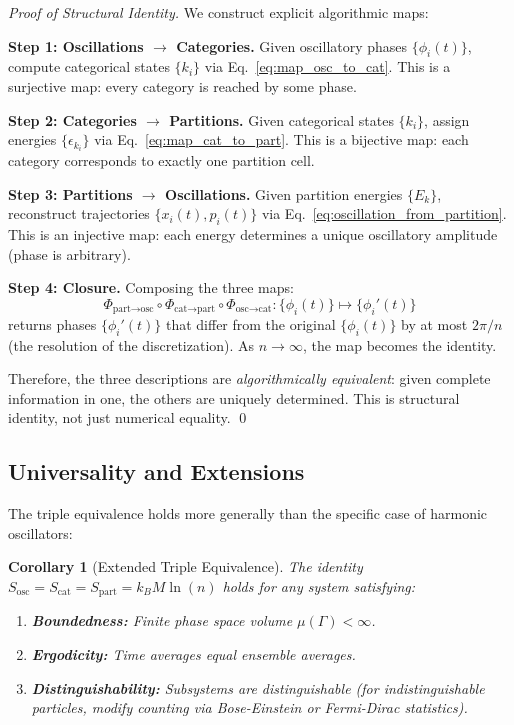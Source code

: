 \documentclass[twocolumn,10pt]{article}
\newtheorem{corollary}[theorem]{Corollary}
\theoremstyle{remark}
\begin{document}
\begin{proof}[Proof of Structural Identity]
We construct explicit algorithmic maps:

\textbf{Step 1: Oscillations $\to$ Categories.}
Given oscillatory phases $\{\phi_i(t)\}$, compute categorical states $\{k_i\}$ via Eq.~\eqref{eq:map_osc_to_cat}. This is a surjective map: every category is reached by some phase.

\textbf{Step 2: Categories $\to$ Partitions.}
Given categorical states $\{k_i\}$, assign energies $\{\epsilon_{k_i}\}$ via Eq.~\eqref{eq:map_cat_to_part}. This is a bijective map: each category corresponds to exactly one partition cell.

\textbf{Step 3: Partitions $\to$ Oscillations.}
Given partition energies $\{E_k\}$, reconstruct trajectories $\{x_i(t), p_i(t)\}$ via Eq.~\eqref{eq:oscillation_from_partition}. This is an injective map: each energy determines a unique oscillatory amplitude (phase is arbitrary).

\textbf{Step 4: Closure.}
Composing the three maps:
\begin{equation}
    \Phi_{\text{part} \to \text{osc}} \circ \Phi_{\text{cat} \to \text{part}} \circ \Phi_{\text{osc} \to \text{cat}}: \{\phi_i(t)\} \mapsto \{\phi_i'(t)\}
\end{equation}
returns phases $\{\phi_i'(t)\}$ that differ from the original $\{\phi_i(t)\}$ by at most $2\pi/n$ (the resolution of the discretization). As $n \to \infty$, the map becomes the identity.

Therefore, the three descriptions are \textit{algorithmically equivalent}: given complete information in one, the others are uniquely determined. This is structural identity, not just numerical equality. \qed
\end{proof}

\subsection{Universality and Extensions}

The triple equivalence holds more generally than the specific case of harmonic oscillators:

\begin{corollary}[Extended Triple Equivalence]
\label{cor:extended_triple}
The identity $S_{\text{osc}} = S_{\text{cat}} = S_{\text{part}} = k_B M \ln(n)$ holds for any system satisfying:
\begin{enumerate}
    \item \textbf{Boundedness:} Finite phase space volume $\mu(\Gamma) < \infty$.
    \item \textbf{Ergodicity:} Time averages equal ensemble averages.
    \item \textbf{Distinguishability:} Subsystems are distinguishable (for indistinguishable particles, modify counting via Bose-Einstein or Fermi-Dirac statistics).
\end{enumerate}
\end{corollary}
\end{document}
